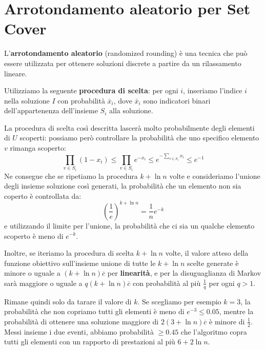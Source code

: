 \documentclass[\main/main.tex]{subfiles}
\begin{document}
\section{Arrotondamento aleatorio per Set Cover}
\begin{observation}
    L'\textbf{arrotondamento aleatorio} (randomized rounding) è una tecnica che può essere utilizzata per ottenere soluzioni discrete a partire da un rilassamento lineare.
\end{observation}
\begin{definition}
    Utilizziamo la seguente \textbf{procedura di scelta}: per ogni \(i\), inseriamo l'indice \(i\) nella soluzione \(I\) con probabilità \(\bar{x}_i\), dove \(\bar{x}_i\) sono indicatori binari dell'appartenenza dell'insieme \(S_i\) alla soluzione.
    
    La procedura di scelta così descritta lascerà molto probabilmente degli elementi di \(U\) scoperti: possiamo però controllare la probabilità che uno specifico elemento \(v\) rimanga scoperto:
    \[
        \prod_{v \in S_{i}}\left(1-x_{i}\right) \leq \prod_{v \in S_{i}} e^{-x_{i}} \leq e^{-\sum_{v \in S_{i}} x_{i}} \leq e^{-1}
    \]
    Ne consegue che se ripetiamo la procedura \(k+\ln n\) volte e consideriamo l'unione degli insieme soluzione così generati, la probabilità che un elemento non sia coperto è controllata da:
    \[
        \left(\frac{1}{e}\right)^{k+\ln n}=\frac{1}{n} e^{-k}
    \]
    e utilizzando il limite per l'unione, la probabilità che ci sia un qualche elemento scoperto è meno di \(e^{-k}\).
    
    Inoltre, se iteriamo la procedura di scelta \(k+\ln n\) volte, il valore atteso della funzione obiettivo sull'insieme unione di tutte le \(k+\ln n\) scelte generate è minore o uguale a \((k+\ln n) \overline{c}\) per \textbf{linearità}, e per la disuguaglianza di Markov sarà maggiore o uguale a \(q(k+\ln n) \overline{c}\) con probabilità al più \(\frac{1}{q}\) per ogni \(q>1\).
    
    Rimane quindi solo da tarare il valore di \(k\). Se scegliamo per esempio \(k=3\), la probabilità che non copriamo tutti gli elementi è meno di \(e^{-3} \leq 0.05\), mentre la probabilità di ottenere una soluzione maggiore di \(2(3+\ln n) \overline{c}\) è minore di \(\frac{1}{2}\). Messi insieme i due eventi, abbiamo probabilità \(\geq 0.45\) che l'algoritmo copra tutti gli elementi con un rapporto di prestazioni al più \(6+2\ln n\).
\end{definition}
\clearpage
\end{document}
